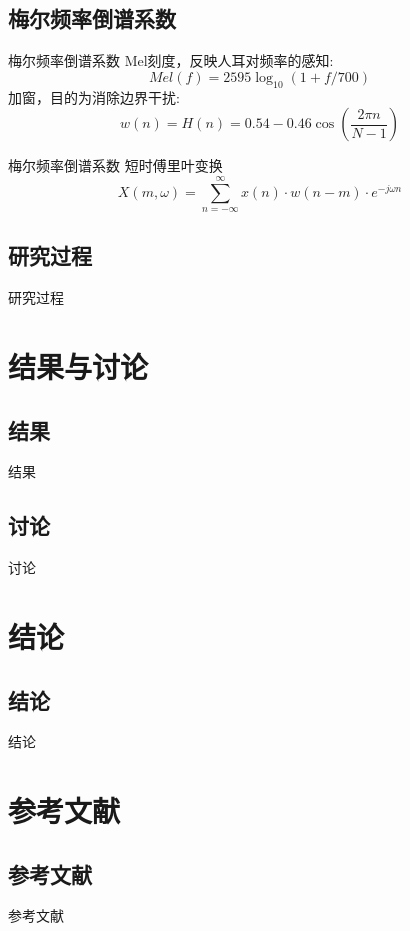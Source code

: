 \documentclass{beamer}
\begin{document}
\subsection{梅尔频率倒谱系数}
\begin{frame}{梅尔频率倒谱系数}
    Mel刻度，反映人耳对频率的感知:
    \begin{equation}
        Mel(f) = 2595 \log_{10}(1+f/700)
    \end{equation}
    加窗，目的为消除边界干扰:
    \begin{equation}
        w(n) = H(n) = 0.54 - 0.46 \cos \left( \frac{2\pi n}{N-1} \right)
    \end{equation}
\end{frame}
\begin{frame}{梅尔频率倒谱系数}
    短时傅里叶变换
    \begin{equation}
        X(m, \omega) = \sum_{n=-\infty}^{\infty} x(n) \cdot w(n-m) \cdot e^{-j\omega n}
    \end{equation}
\end{frame}
\subsection{研究过程}
\begin{frame}{研究过程}
\end{frame}
\section{结果与讨论}
\subsection{结果}
\begin{frame}{结果}
\end{frame}
\subsection{讨论}
\begin{frame}{讨论}
\end{frame}
\section{结论}
\subsection{结论}
\begin{frame}{结论}
\end{frame}
\section{参考文献}
\subsection{参考文献}
\begin{frame}{参考文献}
    
\end{frame}
\end{document}

